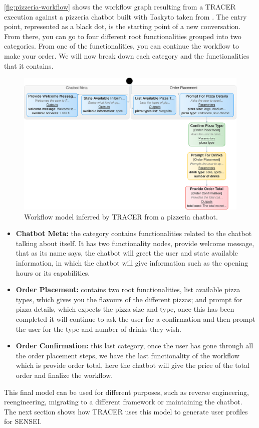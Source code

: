\autoref{fig:pizzeria-workflow}
shows the workflow graph resulting from a \ac{TRACER} execution
against a pizzeria chatbot built with Taskyto taken from
\autocite{sanchezcuadradoAutomatingDevelopmentTaskoriented2024}.
The entry point, represented as a black dot,
is the starting point of a new conversation.
From there, you can go to four different root functionalities
grouped into two categories.
From one of the functionalities,
you can continue the workflow to make your order.
We will now break down each category
and the functionalities that it contains.

\begin{figure}[htpb]
  \centering
  \includegraphics[width=\linewidth]{figures/workflow_graph-crop-back.pdf}
  \caption{
    Workflow model inferred by \ac{TRACER} from a pizzeria chatbot.
  }
  \label{fig:pizzeria-workflow}
\end{figure}

\begin{itemize}
  \item \textbf{Chatbot Meta:}
    the category contains functionalities related to the chatbot talking about itself.
    It has two functionality nodes, provide welcome message, that as its name says,
    the chatbot will greet the user
    and state available information,
    in which the chatbot will give information such as
    the opening hours or its capabilities.

  \item \textbf{Order Placement:}
    contains two root functionalities,
    list available pizza types,
    which gives you the flavours of the different pizzas;
    and prompt for pizza details,
    which expects the pizza size and type,
    once this has been completed
    it will continue to ask the user for a confirmation
    and then prompt the user for the type and number of drinks they wish.

  \item \textbf{Order Confirmation:}
    this last category,
    once the user has gone through all the order placement steps,
    we have the last functionality of the workflow which is
    provide order total,
    here the chatbot will give the price of the total order
    and finalize the workflow.
\end{itemize}

This final model can be used for different purposes,
such as reverse engineering, reengineering,
migrating to a different framework
or maintaining the chatbot.
The next section shows how \ac{TRACER} uses this model
to generate user profiles for SENSEI.
